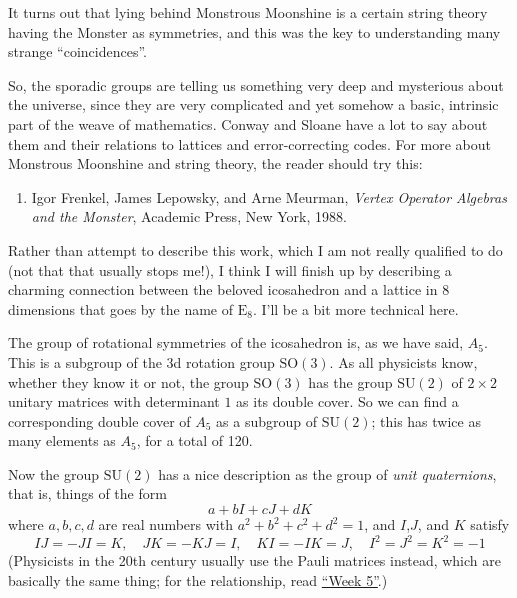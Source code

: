 \documentclass{article}
\def\tightlist{}
\begin{document}
It turns out that lying behind Monstrous Moonshine is a certain string
theory having the Monster as symmetries, and this was the key to
understanding many strange ``coincidences''.

So, the sporadic groups are telling us something very deep and
mysterious about the universe, since they are very complicated and yet
somehow a basic, intrinsic part of the weave of mathematics. Conway and
Sloane have a lot to say about them and their relations to lattices and
error-correcting codes. For more about Monstrous Moonshine and string
theory, the reader should try this:

\begin{enumerate}
\def\labelenumi{\arabic{enumi})}
\setcounter{enumi}{1}
\tightlist
\item
  Igor Frenkel, James Lepowsky, and Arne Meurman, \emph{Vertex Operator
  Algebras and the Monster}, Academic Press, New York, 1988.
\end{enumerate}

Rather than attempt to describe this work, which I am not really
qualified to do (not that that usually stops me!), I think I will finish
up by describing a charming connection between the beloved icosahedron
and a lattice in 8 dimensions that goes by the name of \(\mathrm{E}_8\).
I'll be a bit more technical here.

The group of rotational symmetries of the icosahedron is, as we have
said, \(A_5\). This is a subgroup of the 3d rotation group
\(\mathrm{SO}(3)\). As all physicists know, whether they know it or not,
the group \(\mathrm{SO}(3)\) has the group \(\mathrm{SU}(2)\) of
\(2\times2\) unitary matrices with determinant \(1\) as its double
cover. So we can find a corresponding double cover of \(A_5\) as a
subgroup of \(\mathrm{SU}(2)\); this has twice as many elements as
\(A_5\), for a total of 120.

Now the group \(\mathrm{SU}(2)\) has a nice description as the group of
\emph{unit quaternions}, that is, things of the form
\[a + bI + cJ + dK\] where \(a,b,c,d\) are real numbers with
\(a^2 + b^2 + c^2 + d^2 = 1\), and \(I\),\(J\), and \(K\) satisfy
\[IJ = -JI = K, \quad JK = -KJ = I, \quad KI = -IK = J, \quad I^2 = J^2 = K^2 = -1\]
(Physicists in the 20th century usually use the Pauli matrices instead,
which are basically the same thing; for the relationship, read
\protect\hyperlink{week5}{``Week 5''}.)
\end{document}
